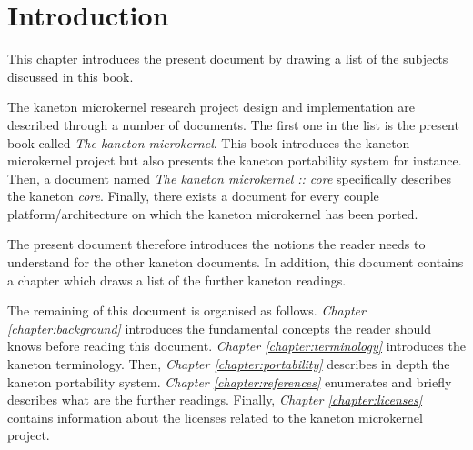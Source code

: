 %
%
%
%
%
%

%
%

\chapter{Introduction}

This chapter introduces the present document by drawing a list of the subjects
discussed in this book.

\newpage

%
%

The kaneton microkernel research project design and implementation are
described through a number of documents. The first one in the list is
the present book called \textit{The kaneton microkernel}. This book introduces
the kaneton microkernel project but also presents the kaneton portability
system for instance. Then, a document named \textit{The kaneton
microkernel :: core} specifically describes the kaneton \textit{core}.
Finally, there exists a document for every couple platform/architecture on
which the kaneton microkernel has been ported.

The present document therefore introduces the notions the reader needs to
understand for the other kaneton documents. In addition, this document contains
a chapter which draws a list of the further kaneton readings.

The remaining of this document is organised as follows. \textit{Chapter
\ref{chapter:background}} introduces the fundamental concepts the reader
should knows before reading this document.  \textit{Chapter
\ref{chapter:terminology}} introduces the kaneton terminology. Then,
\textit{Chapter \ref{chapter:portability}} describes in depth the kaneton
portability system. \textit{Chapter \ref{chapter:references}} enumerates and
briefly describes what are the further readings. Finally, \textit{Chapter
\ref{chapter:licenses}} contains information about the licenses related
to the kaneton microkernel project.

